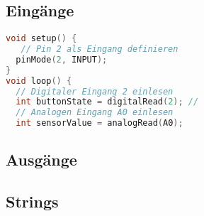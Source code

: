\subsection{\large{Eingänge}}
\begin{lstlisting}[language=c, caption=Beispiel]
void setup() {
   // Pin 2 als Eingang definieren
  pinMode(2, INPUT); 
}
void loop() {
  // Digitaler Eingang 2 einlesen
  int buttonState = digitalRead(2); // 
  // Analogen Eingang A0 einlesen
  int sensorValue = analogRead(A0); 
\end{lstlisting}

\subsection{\large{Ausgänge}}


\subsection{\large{Strings}}
